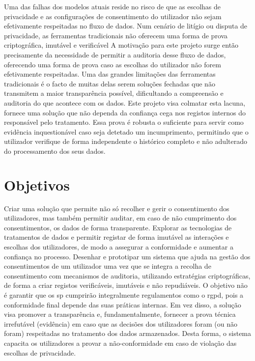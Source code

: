 Uma das falhas dos modelos atuais reside no risco de que as escolhas de privacidade e as configurações de consentimento do utilizador não sejam efetivamente respeitadas no fluxo de dados. Num cenário de litígio ou disputa de privacidade, as ferramentas tradicionais não oferecem uma forma de prova criptográfica, imutável e verificável
A motivação para este projeto surge então precisamente da necessidade de permitir a auditoria desse fluxo de dados, oferecendo uma forma de prova caso as escolhas do utilizador não forem efetivamente respeitadas. 
Uma das grandes limitações das ferramentas tradicionais é o facto de muitas delas serem soluções fechadas que não transmitem a maior transparência possível, dificultando a compreensão e auditoria do que acontece com os dados.
Este projeto visa colmatar esta lacuna, fornece uma solução que não dependa da confiança cega nos registos internos do responsável pelo tratamento. Essa prova é robusta o suficiente para servir como evidência inquestionável caso seja detetado um incumprimento, permitindo que o utilizador verifique de forma independente o histórico completo e não adulterado do processamento dos seus dados.

\section{Objetivos}

Criar uma solução que permite não só recolher e gerir o consentimento dos utilizadores, mas também permitir auditar, em caso de não cumprimento dos consentimentos, os dados de forma transparente.
Explorar as tecnologias de tratamentos de dados e permitir registar de forma imutável as interações e escolhas dos utilizadores, de modo a assegurar a conformidade e aumentar a confiança no processo. 
Desenhar e prototipar um sistema que ajuda na gestão dos consentimentos de um utilizador uma vez que se integra a recolha de consentimento com mecanismos de auditoria, utilizando estratégias criptográficas, de forma a criar registos verificáveis, imutáveis e não repudiáveis.
O objetivo não é garantir que os \acrfull{sp} cumprirão integralmente regulamentos como o \acrshort{rgpd}, pois a conformidade final depende das suas práticas internas. Em vez disso, a solução visa promover a transparência e, fundamentalmente, fornecer a prova técnica irrefutável (evidência) em caso que as decisões dos utilizadores foram (ou não foram) respeitadas no tratamento dos dados armazenados.
Desta forma, o sistema capacita os utilizadores a provar a não-conformidade em caso de violação das escolhas de privacidade.

